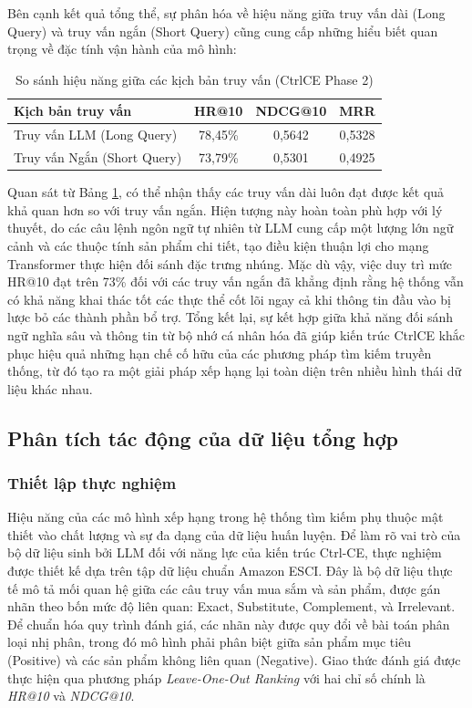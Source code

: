 Bên cạnh kết quả tổng thể, sự phân hóa về hiệu năng giữa truy vấn dài (Long Query) và truy vấn ngắn (Short Query) cũng cung cấp những hiểu biết quan trọng về đặc tính vận hành của mô hình:

\begin{table}[ht]
\centering
\caption{So sánh hiệu năng giữa các kịch bản truy vấn (CtrlCE Phase 2)}
\label{tab:query_type_comparison}
\begin{tabular}{|l|c|c|c|}
\hline
\textbf{Kịch bản truy vấn} & \textbf{HR@10} & \textbf{NDCG@10} & \textbf{MRR} \\ \hline
Truy vấn LLM (Long Query) & 78,45\% & 0,5642 & 0,5328 \\ \hline
Truy vấn Ngắn (Short Query) & 73,79\% & 0,5301 & 0,4925 \\ \hline
\end{tabular}
\end{table}

Quan sát từ Bảng \ref{tab:query_type_comparison}, có thể nhận thấy các truy vấn dài luôn đạt được kết quả khả quan hơn so với truy vấn ngắn. Hiện tượng này hoàn toàn phù hợp với lý thuyết, do các câu lệnh ngôn ngữ tự nhiên từ LLM cung cấp một lượng lớn ngữ cảnh và các thuộc tính sản phẩm chi tiết, tạo điều kiện thuận lợi cho mạng Transformer thực hiện đối sánh đặc trưng nhúng. Mặc dù vậy, việc duy trì mức HR@10 đạt trên 73\% đối với các truy vấn ngắn đã khẳng định rằng hệ thống vẫn có khả năng khai thác tốt các thực thể cốt lõi ngay cả khi thông tin đầu vào bị lược bỏ các thành phần bổ trợ. Tổng kết lại, sự kết hợp giữa khả năng đối sánh ngữ nghĩa sâu và thông tin từ bộ nhớ cá nhân hóa đã giúp kiến trúc CtrlCE khắc phục hiệu quả những hạn chế cố hữu của các phương pháp tìm kiếm truyền thống, từ đó tạo ra một giải pháp xếp hạng lại toàn diện trên nhiều hình thái dữ liệu khác nhau.

\subsection{Phân tích tác động của dữ liệu tổng hợp}

\subsubsection*{Thiết lập thực nghiệm}
Hiệu năng của các mô hình xếp hạng trong hệ thống tìm kiếm phụ thuộc mật thiết vào chất lượng và sự đa dạng của dữ liệu huấn luyện. Để làm rõ vai trò của bộ dữ liệu sinh bởi LLM đối với năng lực của kiến trúc Ctrl-CE, thực nghiệm được thiết kế dựa trên tập dữ liệu chuẩn Amazon ESCI. Đây là bộ dữ liệu thực tế mô tả mối quan hệ giữa các câu truy vấn mua sắm và sản phẩm, được gán nhãn theo bốn mức độ liên quan: Exact, Substitute, Complement, và Irrelevant. Để chuẩn hóa quy trình đánh giá, các nhãn này được quy đổi về bài toán phân loại nhị phân, trong đó mô hình phải phân biệt giữa sản phẩm mục tiêu (Positive) và các sản phẩm không liên quan (Negative). Giao thức đánh giá được thực hiện qua phương pháp \textit{Leave-One-Out Ranking} với hai chỉ số chính là \textit{HR@10} và \textit{NDCG@10}.

